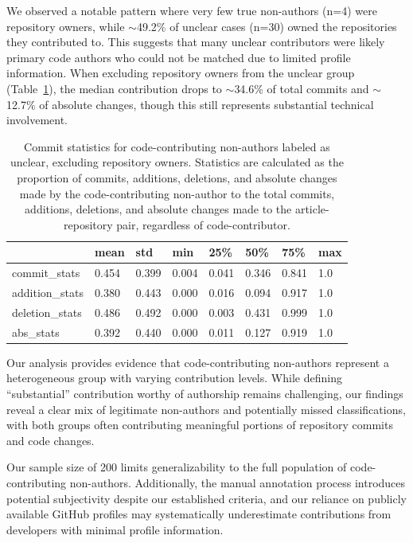 \documentclass[
  letterpaper,
  DIV=11,
  numbers=noendperiod]{scrartcl}
\begin{document}
We observed a notable pattern where very few true non-authors (n=4) were
repository owners, while $\sim$49.2\% of unclear cases (n=30)
owned the repositories they contributed to. This suggests that many
unclear contributors were likely primary code authors who could not be
matched due to limited profile information. When excluding repository
owners from the unclear group
(Table~\ref{tbl-unclear-cc-na-commit-stats-no-repo-owner}), the median
contribution drops to $\sim$34.6\% of total commits and
$\sim$12.7\% of absolute changes, though this still represents
substantial technical involvement.

\begin{longtable}[]{@{}llllllll@{}}

\caption{\label{tbl-unclear-cc-na-commit-stats-no-repo-owner}Commit
statistics for code-contributing non-authors labeled as unclear,
excluding repository owners. Statistics are calculated as the proportion
of commits, additions, deletions, and absolute changes made by the
code-contributing non-author to the total commits, additions, deletions,
and absolute changes made to the article-repository pair, regardless of
code-contributor.}

\tabularnewline

\toprule\noalign{}
& mean & std & min & 25\% & 50\% & 75\% & max \\
\midrule\noalign{}
\endhead
\bottomrule\noalign{}
\endlastfoot
commit\_stats & 0.454 & 0.399 & 0.004 & 0.041 & 0.346 & 0.841 & 1.0 \\
addition\_stats & 0.380 & 0.443 & 0.000 & 0.016 & 0.094 & 0.917 & 1.0 \\
deletion\_stats & 0.486 & 0.492 & 0.000 & 0.003 & 0.431 & 0.999 & 1.0 \\
abs\_stats & 0.392 & 0.440 & 0.000 & 0.011 & 0.127 & 0.919 & 1.0 \\

\end{longtable}

Our analysis provides evidence that code-contributing non-authors
represent a heterogeneous group with varying contribution levels. While
defining ``substantial'' contribution worthy of authorship remains
challenging, our findings reveal a clear mix of legitimate non-authors
and potentially missed classifications, with both groups often
contributing meaningful portions of repository commits and code changes.

Our sample size of 200 limits generalizability to the full population of
code-contributing non-authors. Additionally, the manual annotation
process introduces potential subjectivity despite our established
criteria, and our reliance on publicly available GitHub profiles may
systematically underestimate contributions from developers with minimal
profile information.
\end{document}
